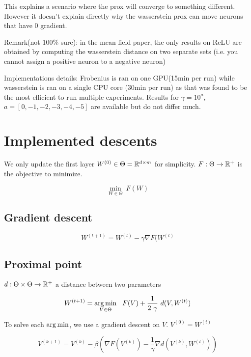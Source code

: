 This explains a scenario where the prox will converge to something different. However it doesn't explain directly why the wasserstein prox can move neurons that have 0 gradient.

Remark(not 100\% sure): in the mean field paper, the only results on ReLU are obtained by computing the wasserstein distance on two separate sets (i.e. you cannot assign a positive neuron to a negative neuron)


Implementations details: Frobenius is ran on one GPU(15min per run) while wasserstein is ran on a single CPU core (30min per run) as that was found to be the most efficient to run multiple experiments. Results for $\gamma=10^{a}$, $a=[0, -1, -2, -3, -4, -5]$ are available but do not differ much.

\section{Implemented descents}

We only update the first layer $W^{(0)} \in \Theta = \mathbb{R}^{d \times m}$ for simplicity. $F : \Theta \rightarrow \mathbb{R}^+$ is the objective to minimize.

\begin{equation}
	\min_{W \in \Theta} \ F(W)
\end{equation}

\subsection{Gradient descent}

\begin{equation}
	W^{(t+1)} = W^{(t)} - \gamma \nabla F(W^{(t)}
\end{equation}

\subsection{Proximal point}

$d: \Theta \times \Theta \rightarrow \mathbb{R}^+$ a distance between two parameters

\begin{equation}
	W^{(t+1)} = \argmin_{V \in \Theta} \ \  F(V) + \frac{1}{2 ~ \gamma} ~ d(V, W^{(t)})
\end{equation}

To solve each $\operatorname*{arg\,min}$, we use a gradient descent on $V$. $V^{(0)} = W^{(t)}$

\begin{equation}
	V^{(k+1)} = V^{(k)} - \beta \left(\nabla F(V^{(k)}) - \frac{1}{\gamma} \nabla d(V^{(k)}, W^{(t)})\right)
\end{equation}

